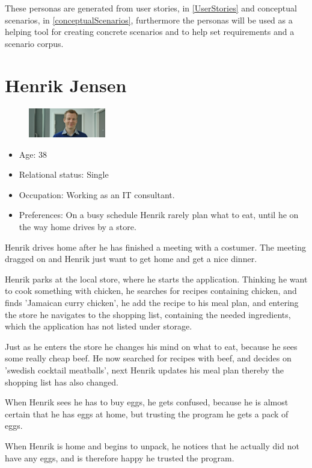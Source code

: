 These personas are generated from user stories, in \cref{UserStories} and conceptual scenarios, in \cref{conceptualScenarios}, furthermore the personas will be used as a helping tool for creating concrete scenarios and to help set requirements and a scenario corpus.

\section{Henrik Jensen} \label{PersonaHenrikJensen}
\begin{figure}[H]
	\includegraphics[width=0.30\textwidth]{Grafik/FoodPlanner/PersonaHenrikJensen}
\end{figure}
\begin{itemize}
	\item Age: 38
	\item Relational status: Single
	\item Occupation: Working as an IT consultant.
	\item Preferences: On a busy schedule Henrik rarely plan what to eat, until he on the way home drives by a store.
\end{itemize}
Henrik drives home after he has finished a meeting with a costumer. The meeting dragged on and Henrik just want to get home and get a nice dinner.

Henrik parks at the local store, where he starts the application. Thinking he want to cook something with chicken, he searches for recipes containing chicken, and finds 'Jamaican curry chicken', he add the recipe to his meal plan, and entering the store he navigates to the shopping list, containing the needed ingredients, which the application has not listed under storage.

Just as he enters the store he changes his mind on what to eat, because he sees some really cheap beef. He now searched for recipes with beef, and decides on 'swedish cocktail meatballs', next Henrik updates his meal plan thereby the shopping list has also changed.

When Henrik sees he has to buy eggs, he gets confused, because he is almost certain that he has eggs at home, but trusting the program he gets a pack of eggs.

When Henrik is home and begins to unpack, he notices that he actually did not have any eggs, and is therefore happy he trusted the program.


